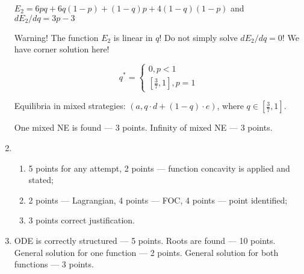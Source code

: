 \begin{enumerate}
    
    $E_2=6pq+6q(1-p)+(1-q)p+4(1-q)(1-p)$ and $dE_2/dq=3p-3$

    Warning! The function $E_2$ is linear in $q$! Do not simply solve $dE_2/dq=0$! 
    We have corner solution here!

    \[
      q^*=\begin{cases}
        0, p<1 \\
         \left[ \frac{3}{7},1 \right], p=1
    \end{cases}
    \]

    Equilibria in mixed strategies: $(a,q\cdot d+(1-q)\cdot e)$, where $q\in\left[ \frac{3}{7}, 1\right]$.
    
    One mixed NE is found — 3 points. Infinity of mixed NE — 3 points.

    \item 
    \begin{enumerate}
      \item 5 points for any attempt, 2 points — function concavity is applied and stated;
      \item 2 points — Lagrangian, 4 points — FOC, 4 points — point identified;
      \item 3 points correct justification.
    \end{enumerate}
    
    \item  ODE is correctly structured — 5 points. Roots are found — 10 points.
    General solution for one function  — 2 points.
    General solution for both functions — 3 points.
  
\end{enumerate}